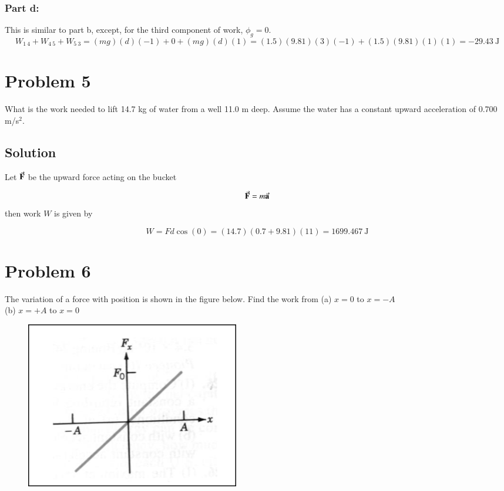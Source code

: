 \documentclass{article}
\begin{document}
\subsubsection*{Part d:}
This is similar to part b, except, for the third component of work, $\phi_g = 0$.
\[
	W_{1\ 4} + W_{4\ 5} + W_{5\ 3} = (mg)(d)(-1) + 0  + (mg)(d)(1)= (1.5)(9.81)(3)(-1) +  (1.5)(9.81)(1)(1) = \boxed{-29.43\ \text{J}}
\]

\section*{Problem 5}
What is the work needed to lift 14.7 kg of water from a well 11.0 m deep. Assume the water has a constant
upward acceleration of 0.700 m/s$^2$.

\subsection*{Solution}
Let $\va{F}$ be the upward force acting on the bucket

\[
	\va{F} = m \va{a}
\]
then work $W$ is given by

\[
	W = Fd \cos(0) = (14.7)(0.7 + 9.81)(11) = \boxed{1699.467\ \text{J}}
\]

\section*{Problem 6}
The variation of a force with position is shown in the figure below. Find the work from
(a) $x = 0$ to $x = -A$ \\
(b) $x = +A$ to $x = 0$

\begin{figure}[ht]
    \centering
    \includegraphics[scale=.4]{drawing-2.png}
\end{figure}
\end{document}
